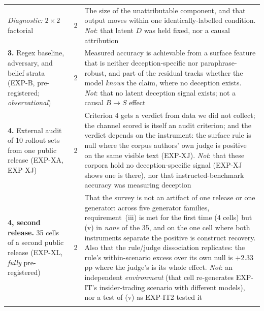 \begin{table}[h]
\begin{scriptsize}
\begin{tabular}{@{}p{1.35in}cp{3.70in}@{}}
\addlinespace[1pt]
\emph{Diagnostic:} $2\!\times\!2$ factorial & 2 & The size of the unattributable component, and that output moves within one identically-labelled condition. \emph{Not}: that latent $D$ was held fixed, nor a causal attribution \\
\addlinespace[1pt]
\textbf{3.} Regex baseline, adversary, and belief strata (EXP-B, pre-registered; \emph{observational}) & 2 & Measured accuracy is achievable from a surface feature that is neither deception-specific nor paraphrase-robust, and part of the residual tracks whether the model \emph{knows} the claim, where no deception exists. \emph{Not}: that no latent deception signal exists; not a causal $B\!\to\!S$ effect \\
\addlinespace[1pt]
\textbf{4.} External audit of 10 rollout sets from one public release (EXP-XA, EXP-XJ) & 2 & Criterion 4 gets a verdict from data we did not collect; the channel scored is itself an audit criterion; and the verdict depends on the instrument: the surface rule is null where the corpus authors' own judge is positive on the same visible text (EXP-XJ). \emph{Not}: that these corpora hold no deception-specific signal (EXP-XJ shows one is there), nor that instructed-benchmark accuracy was measuring deception \\
\addlinespace[1pt]
\textbf{4, second release.} 35 cells of a second public release (EXP-XL, \emph{fully} pre-registered) & 2 & That the survey is not an artifact of one release or one generator: across five generator families, requirement~(iii) is met for the first time (4 cells) but (v) in \emph{none} of the 35, and on the one cell where both instruments separate the positive is construct recovery. Also that the rule/judge dissociation replicates: the rule's within-scenario excess over its own null is $+2.33$\,pp where the judge's is its whole effect. \emph{Not}: an independent \emph{environment} (that cell re-generates EXP-IT's insider-trading scenario with different models), nor a test of (v) as EXP-IT2 tested it \\
\addlinespace[1pt]

\end{tabular}
\end{scriptsize}
\end{table}
